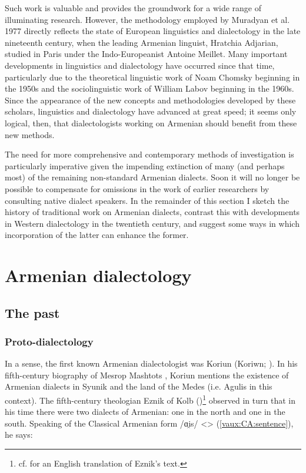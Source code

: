 \documentclass[output=paper]{langscibook}
\begin{document}
Such work is valuable and provides the groundwork for a wide range of illuminating research. However, the methodology employed by Muradyan et al. 1977 directly reflects the state of European linguistics and dialectology in the late nineteenth century, when the leading Armenian linguist, Hratchia Adjarian, studied in Paris under the Indo-Europeanist Antoine Meillet. Many important developments in linguistics and dialectology have occurred since that time, particularly due to the theoretical linguistic work of Noam Chomsky beginning in the 1950s and the sociolinguistic work of William Labov beginning in the 1960s. Since the appearance of the new concepts and methodologies developed by these scholars, linguistics and dialectology have advanced at great speed; it seems only logical, then, that dialectologists working on Armenian should benefit from these new methods. 	

The need for more comprehensive and contemporary methods of investigation is particularly imperative given the impending extinction of many (and perhaps most) of the remaining non-standard Armenian dialects. Soon it will no longer be possible to compensate for omissions in the work of earlier researchers by consulting native dialect speakers. In the remainder of this section I sketch the history of traditional work on Armenian dialects, contrast this with developments in Western dialectology in the twentieth century, and suggest some ways in which incorporation of the latter can enhance the former.




\section{Armenian dialectology}\label{sec:vaux:dialectology}
	
\subsection{The past}\label{sec:vaux:dialectology:past}
	
\subsubsection{Proto-dialectology}\label{sec:vaux:dialectology:past:proto}

In a sense, the first known Armenian dialectologist was Koriun (Koriwn; ). In his fifth-century biography of Mesrop Mashtots \citep{Koriun-1985-VarkMastotosLifeMashtots}, Koriun mentions the existence of Armenian dialects in Syunik and the land of the Medes (i.e. Agulis in this context). The fifth-century theologian Eznik of Kolb ()\footnote{cf. \citealt{BlanchardYoung-1998-treatiseGodwrittenArmenianEznikKofloruit430c450} for an English translation of Eznik's text. } observed  in turn that in his time there were two dialects of Armenian: one in the north and one in the south. Speaking of the Classical Armenian form /ɑi̯s/ <> (\ref{vaux:CA:sentence}), he says:
\end{document}
